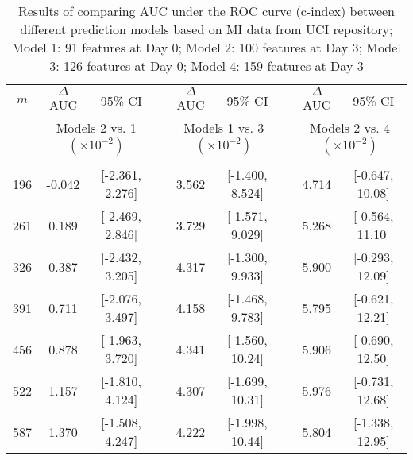 \documentclass[12pt]{article}
\begin{document}
\begin{table}[ht]{
\centering
\setlength{\tabcolsep}{3pt}
\renewcommand{\arraystretch}{0.5}
\begin{tabular}{ ccc c cc c cc }
\hline
$m$   & $\Delta$ AUC  & 95\% CI &&  $\Delta$ AUC & 95\% CI && $\Delta$ AUC & 95\% CI\\
    & \multicolumn{2}{c}{ Models 2 vs. 1 $(\times 10^{-2})$} && \multicolumn{2}{c}{Models 1 vs. 3 $(\times 10^{-2})$} && \multicolumn{2}{c}{Models 2 vs. 4 $(\times 10^{-2})$}  \\
    \cline{2-3} \cline{5-6} \cline{8-9}\\
196 & -0.042 & [-2.361, 2.276] && 3.562 & [-1.400, 8.524] && 4.714 & [-0.647, 10.08] \\
261 & 0.189  & [-2.469, 2.846] && 3.729 & [-1.571, 9.029] && 5.268 & [-0.564, 11.10] \\
326 & 0.387  & [-2.432, 3.205] && 4.317 & [-1.300, 9.933] && 5.900 & [-0.293, 12.09] \\
391 & 0.711  & [-2.076, 3.497] && 4.158 & [-1.468, 9.783] && 5.795 & [-0.621, 12.21] \\
456 & 0.878  & [-1.963, 3.720] && 4.341 & [-1.560, 10.24] && 5.906 & [-0.690, 12.50] \\
522 & 1.157  & [-1.810, 4.124] && 4.307 & [-1.699, 10.31] && 5.976 & [-0.731, 12.68] \\
587 & 1.370  & [-1.508, 4.247] && 4.222 & [-1.998, 10.44] && 5.804 & [-1.338, 12.95] \\
\end{tabular} 
\caption{Results of comparing AUC under the ROC curve (c-index) between different prediction models based on MI data from UCI repository; Model 1: 91 features at Day 0; Model 2: 100 features at Day 3; Model 3: 126 features at Day 0; Model 4: 159 features at Day 3 }\label{tab:example2a2}}
\end{table} 
\end{document}
